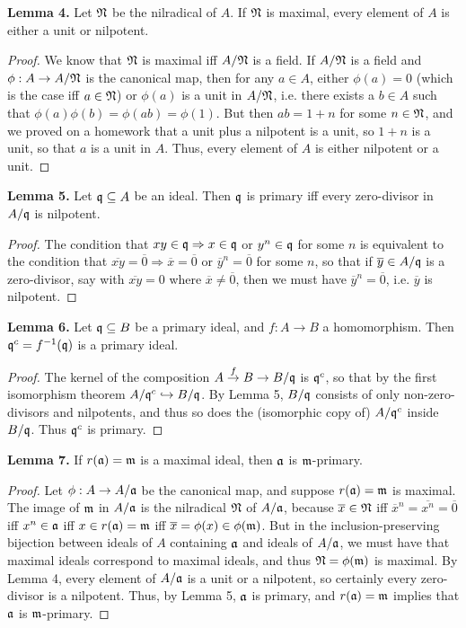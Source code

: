\documentclass[11pt]{article}
\begin{document}
{\bf Lemma 4.} Let $\frak{N}$ be the nilradical of $A$. If $\frak{N}$ is
maximal, every element of $A$ is either a unit or nilpotent.
\begin{proof}
We know that $\frak{N}$ is maximal iff $A/\frak{N}$ is a field. If $A/\frak{N}$
is a field and $\phi:A\rightarrow A/\frak{N}$ is the canonical map, then for
any $a\in A$, either $\phi(a)=0$ (which is the case iff $a\in\frak{N}$) or
$\phi(a)$ is a unit in $A/\frak{N}$, i.e. there exists a $b\in A$ such that
$\phi(a)\phi(b)=\phi(ab)=\phi(1)$. But then $ab=1+n$ for some $n\in\frak{N}$,
and we proved on a homework that a unit plus a nilpotent is a unit, so $1+n$
is a unit, so that $a$ is a unit in $A$. Thus, every element of $A$ is either
nilpotent or a unit.
\end{proof}
\pagebreak
{\bf Lemma 5.} Let $\frak{q}\subseteq A$ be an ideal. Then $\frak{q}$ is
primary iff every zero-divisor in $A/\frak{q}$ is nilpotent.
\begin{proof}
The condition that $xy\in\frak{q}\Rightarrow x\in\frak{q}$ or
$y^n\in\frak{q}$ for some $n$ is equivalent to the condition that
$\overline{xy}=\overline{0}\Rightarrow\overline{x}=\overline{0}$ or
$\overline{y}^n=\overline{0}$ for some $n$, so that if $\overline{y}\in
A/\frak{q}$ is a zero-divisor, say with $\overline{xy}=0$
where $\overline{x}\neq\overline{0}$, then we must have
$\overline{y}^n=\overline{0}$, i.e. $\overline{y}$ is nilpotent.
\end{proof}

{\bf Lemma 6.} Let $\frak{q}\subseteq B$ be a primary ideal, and
$f:A\rightarrow B$ a homomorphism. Then $\frak{q}^c=f^{-1}(\frak{q})$ is a
primary ideal.
\begin{proof}
The kernel of the composition $A\stackrel{f}{\rightarrow}B\rightarrow
B/\frak{q}$ is $\frak{q}^c$, so that by the first isomorphism theorem
$A/\frak{q}^c\hookrightarrow B/\frak{q}$. By Lemma 5, $B/\frak{q}$ consists
of only non-zero-divisors and nilpotents, and thus so does the (isomorphic
copy of) $A/\frak{q}^c$ inside $B/\frak{q}$. Thus $\frak{q}^c$ is primary.
\end{proof}

{\bf Lemma 7.} If $r(\frak{a})=\frak{m}$ is a maximal ideal, then $\frak{a}$
is $\frak{m}$-primary.
\begin{proof} 
Let $\phi:A\rightarrow A/\frak{a}$ be the canonical map, and suppose
$r(\frak{a})=\frak{m}$ is maximal. The image of $\frak{m}$ in $A/\frak{a}$ is
the nilradical $\frak{N}$ of $A/\frak{a}$, because $\overline{x}\in\frak{N}$
iff $\overline{x}^n=\overline{x^n}=\overline{0}$ iff $x^n\in\frak{a}$ iff $x\in
r(\frak{a})=\frak{m}$ iff $\overline{x}=\phi(x)\in\phi(\frak{m})$. But in the
inclusion-preserving bijection between ideals of $A$ containing $\frak{a}$
and ideals of $A/\frak{a}$, we must have that maximal ideals correspond to
maximal ideals, and thus $\frak{N}=\phi(\frak{m})$ is maximal. By Lemma 4,
every element of $A/\frak{a}$ is a unit or a nilpotent, so certainly every
zero-divisor is a nilpotent. Thus, by Lemma 5, $\frak{a}$ is primary, and
$r(\frak{a})=\frak{m}$ implies that $\frak{a}$ is $\frak{m}$-primary.
\end{proof}
\end{document}
